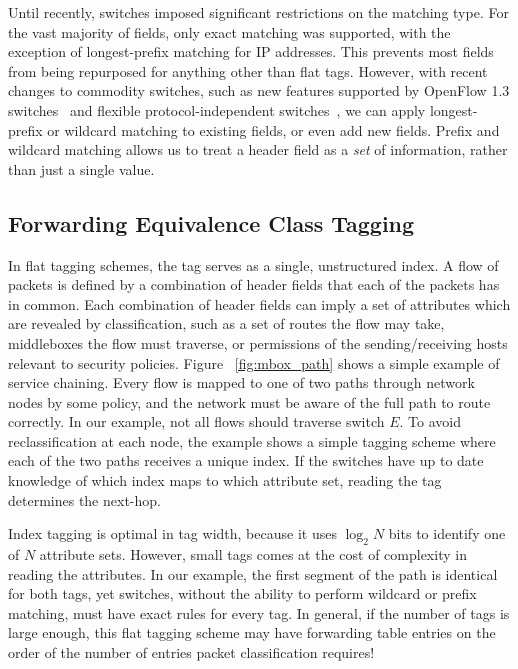 Until recently, switches imposed significant restrictions on the matching type.
For the vast majority of fields, only exact matching was supported, with the
exception of longest-prefix matching for IP addresses. This prevents most fields
from being repurposed for anything other than flat tags. However, with recent
changes to commodity switches, such as new features supported by OpenFlow 1.3
switches~\cite{of13} and flexible protocol-independent switches~\cite{P4}, we
can apply longest-prefix or wildcard matching to existing fields, or even add
new fields. Prefix and wildcard matching allows us to treat a header field as a
\emph{set} of information, rather than just a single value. 

\subsection{Forwarding Equivalence Class Tagging} In flat tagging schemes, the
tag serves as a single, unstructured index.  A flow of packets is defined by a
combination of header fields that each of the packets has in common. Each
combination of header fields can imply a set of attributes which are revealed by
classification, such as a set of routes the flow may take, middleboxes the flow
must traverse, or permissions of the sending/receiving hosts relevant to
security policies.  Figure ~\ref{fig:mbox_path} shows a simple example of
service chaining. Every flow is mapped to one of two paths through network nodes
by some policy, and the network must be aware of the full path to route
correctly. In our example, not all flows should traverse switch $E$. To avoid
reclassification at each node, the example shows a simple tagging scheme where
each of the two paths receives a unique index. If the switches have up to date
knowledge of which index maps to which attribute set, reading the tag determines
the next-hop. 

Index tagging is optimal in tag width, because it uses $\log_2{N}$ bits to
identify one of $N$ attribute sets. However, small tags comes at the cost of
complexity in reading the attributes. In our example, the first segment of the
path is identical for both tags, yet switches, without the ability to perform
wildcard or prefix matching, must have exact rules for every tag. In general, if
the number of tags is large enough, this flat tagging scheme may have forwarding
table entries on the order of the number of entries packet classification
requires!



